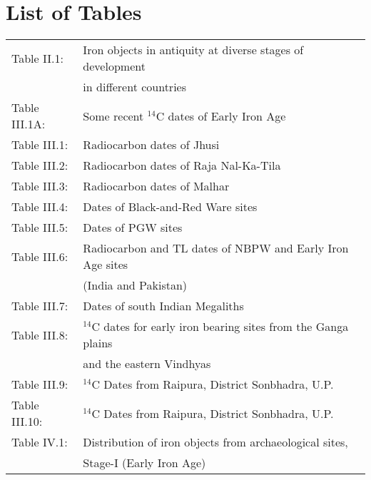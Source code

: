 \chapter*{\centering List of Tables}\label{table}


\vspace{-1cm}

{\fontsize{7}{10}\selectfont\begin{longtable}{ll}
Table II.1:	&Iron objects in antiquity at diverse stages of development\\[2pt]
            
            &  in different countries \\[2pt]
            
Table III.1A:&	Some recent $^{14}$C dates of Early Iron Age\\[2pt]

Table III.1:&	Radiocarbon dates of Jhusi\\[2pt]

Table III.2:&	Radiocarbon dates of Raja Nal-Ka-Tila\\[2pt]

Table III.3:&	Radiocarbon dates of Malhar\\[2pt]

Table III.4:&	Dates of Black-and-Red Ware sites \\[2pt]

Table III.5:&	Dates of PGW sites \\[2pt]

Table III.6:&	Radiocarbon and TL dates of NBPW and Early Iron Age sites\\
            
            &  (India and Pakistan)\\[2pt]
Table III.7:&	Dates of south Indian Megaliths\\ [2pt]

Table III.8:&	$^{14}$C dates for early iron bearing sites from the Ganga plains\\[2pt]
            
            & and the eastern Vindhyas\\[2pt]

Table III.9:&  $^{14}$C Dates from Raipura, District Sonbhadra, U.P.\\[2pt]

Table III.10: & $^{14}$C Dates from Raipura, District Sonbhadra, U.P.\\[2pt]

Table IV.1:&	Distribution of iron objects from archaeological sites,\\[2pt]
           & Stage-I (Early Iron Age)\\[2pt]


\end{longtable}}
